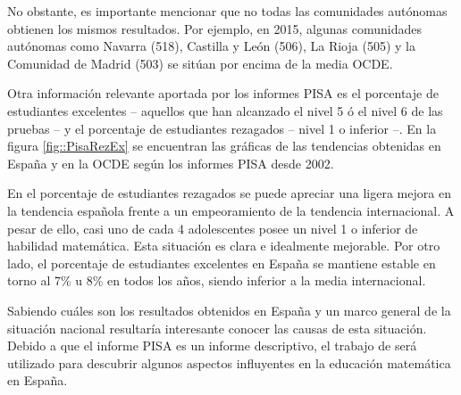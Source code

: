 No obstante, es importante mencionar que no todas las comunidades autónomas obtienen los mismos resultados. 
%
Por ejemplo, en 2015, algunas comunidades autónomas como Navarra (518), Castilla y León (506), La Rioja (505) y la Comunidad de Madrid (503) se sitúan por encima de la media OCDE.


Otra información relevante aportada por los informes PISA es el porcentaje de estudiantes excelentes -- aquellos que han alcanzado el nivel 5 ó el nivel 6 de las pruebas -- y el porcentaje de estudiantes rezagados -- nivel 1 o inferior --.
%
En la figura \ref{fig::PisaRezEx} se encuentran las gráficas de las tendencias obtenidas en España y en la OCDE según los informes PISA desde 2002.



En el porcentaje de estudiantes rezagados se puede apreciar una ligera mejora en la tendencia española frente a un empeoramiento de la tendencia internacional.
%
A pesar de ello, casi uno de cada 4 adolescentes posee un nivel 1 o inferior de habilidad matemática. 
%
Esta situación es clara e idealmente mejorable.
%
Por otro lado, el porcentaje de estudiantes excelentes en España se mantiene estable en torno al 7\% u 8\% en todos los años, siendo inferior a la media internacional.

Sabiendo cuáles son los resultados obtenidos en España y un marco general de la situación nacional resultaría interesante conocer las causas de esta situación.
%
Debido a que el informe PISA es un informe descriptivo, el trabajo de \cite{ActitudesHaciaMates} será utilizado para descubrir algunos aspectos influyentes en la educación matemática en España.

